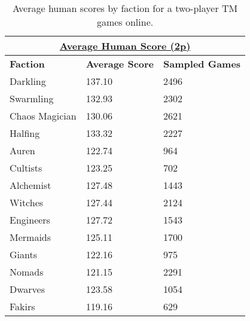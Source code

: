\documentclass[10pt,twocolumn,letterpaper]{article}
\begin{document}
\begin{table}[h!]
\begin{tabular}{|l|l|l|}
\hline
\multicolumn{3}{|c|}{{\ul \textbf{Average Human Score (2p)}}}      \\ \hline
\textbf{Faction} & \textbf{Average Score} & \textbf{Sampled Games} \\ \hline
Darkling         & 137.10                 & 2496                   \\ \hline
Swarmling        & 132.93                 & 2302                   \\ \hline
Chaos Magician   & 130.06                 & 2621                   \\ \hline
Halfing          & 133.32                 & 2227                   \\ \hline
Auren            & 122.74                 & 964                    \\ \hline
Cultists         & 123.25                 & 702                    \\ \hline
Alchemist        & 127.48                 & 1443                   \\ \hline
Witches          & 127.44                 & 2124                   \\ \hline
Engineers        & 127.72                 & 1543                   \\ \hline
Mermaids         & 125.11                 & 1700                   \\ \hline
Giants           & 122.16                 & 975                    \\ \hline
Nomads           & 121.15                 & 2291                   \\ \hline
Dwarves          & 123.58                 & 1054                   \\ \hline
Fakirs           & 119.16                 & 629                    \\ \hline
\end{tabular}
\caption{Average human scores by faction for a two-player TM games online.}
\label{table:average_2p_score}
\end{table}
\end{document}
